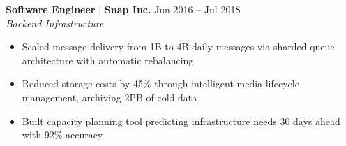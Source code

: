 \documentclass[10pt,letterpaper]{article}
\begin{document}
\begin{minipage}[t]{0.65\textwidth}
\begin{minipage}{\dimexpr\textwidth-16pt}
\vspace{6pt}
\textbf{Software Engineer} $\mid$ \textbf{Snap Inc.} \hfill {\small Jun 2016 -- Jul 2018}\\
{\small\itshape Backend Infrastructure}
\begin{itemize}
    \item Scaled message delivery from 1B to 4B daily messages via sharded queue architecture with automatic rebalancing
    \item Reduced storage costs by 45\% through intelligent media lifecycle management, archiving 2PB of cold data
    \item Built capacity planning tool predicting infrastructure needs 30 days ahead with 92\% accuracy
\end{itemize}

\end{minipage}
\end{minipage}
\end{document}
